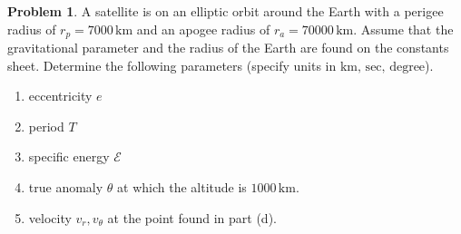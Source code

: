 \documentclass[10pt]{article}
\theoremstyle{definition}
\newtheorem{prob}{Problem}[section]
\newenvironment{subprob}%
{\renewcommand{\theenumi}{\alph{enumi}}\renewcommand{\labelenumi}{(\theenumi)}\begin{enumerate}}%
{\end{enumerate}}%
\begin{document}
\begin{prob}
A satellite is on an elliptic orbit around the Earth with a perigee radius of $r_p=7000\,\mathrm{km}$ and an apogee radius of $r_a=70000\,\mathrm{km}$. Assume that the gravitational parameter and the radius of the Earth are found on the constants sheet. Determine the following parameters (specify units in $\mathrm{km},\,\mathrm{sec},\,\mathrm{degree}$). 
\begin{subprob}
\item eccentricity $e$
\item period $T$ 
\item specific energy $\mathcal{E}$
\item true anomaly $\theta$ at which the altitude is $1000\,\mathrm{km}$.
\item velocity $v_r,v_\theta$ at the point found in part (d).
\end{subprob}
\end{prob}

%
\end{document}
